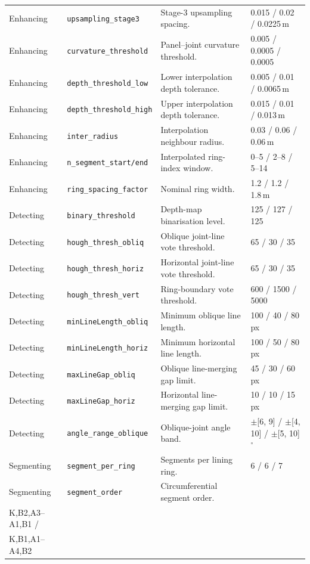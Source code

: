 \documentclass[a4paper,fleqn]{cas-dc}
\begin{document}
{\begin{table}[t]
\begin{tabular*}{\textwidth}{@{\extracolsep{\fill}} l l p{} l @{}}
Enhancing & \texttt{upsampling\_stage3} & Stage-3 upsampling spacing. & 0.015 / 0.02 / 0.0225\,m \\
Enhancing & \texttt{curvature\_threshold} & Panel--joint curvature threshold. & 0.005 / 0.0005 / 0.0005 \\
Enhancing & \texttt{depth\_threshold\_low} & Lower interpolation depth tolerance. & 0.005 / 0.01 / 0.0065\,m \\
Enhancing & \texttt{depth\_threshold\_high} & Upper interpolation depth tolerance. & 0.015 / 0.01 / 0.013\,m \\
Enhancing & \texttt{inter\_radius} & Interpolation neighbour radius. & 0.03 / 0.06 / 0.06\,m \\
Enhancing & \texttt{n\_segment\_start/end} & Interpolated ring-index window. & 0--5 / 2--8 / 5--14 \\
Enhancing & \texttt{ring\_spacing\_factor} & Nominal ring width. & 1.2 / 1.2 / 1.8\,m \\
\midrule
Detecting & \texttt{binary\_threshold} & Depth-map binarisation level. & 125 / 127 / 125 \\
Detecting & \texttt{hough\_thresh\_obliq} & Oblique joint-line vote threshold. & 65 / 30 / 35 \\
Detecting & \texttt{hough\_thresh\_horiz} & Horizontal joint-line vote threshold. & 65 / 30 / 35 \\
Detecting & \texttt{hough\_thresh\_vert} & Ring-boundary vote threshold. & 600 / 1500 / 5000 \\
Detecting & \texttt{minLineLength\_obliq} & Minimum oblique line length. & 100 / 40 /  80\,px \\
Detecting & \texttt{minLineLength\_horiz} & Minimum horizontal line length. & 100 / 50 /  80\,px \\
Detecting & \texttt{maxLineGap\_obliq} & Oblique line-merging gap limit. & 45 / 30 /  60\,px \\
Detecting & \texttt{maxLineGap\_horiz} & Horizontal line-merging gap limit. & 10 / 10 /  15\,px \\
Detecting & \texttt{angle\_range\_oblique} & Oblique-joint angle band. & $\pm$[6, 9] / $\pm$[4, 10] / $\pm$[5, 10]$^{\circ}$ \\
\midrule
Segmenting & \texttt{segment\_per\_ring} & Segments per lining ring. & 6 / 6 / 7 \\
Segmenting & \texttt{segment\_order} & Circumferential segment order. & \begin{tabular}[t]{@{}l@{}}K,B1,A1--A3,B2 /\\K,B2,A3--A1,B1 /\\K,B1,A1--A4,B2\end{tabular} \\

\end{tabular*}
\end{table}}
\end{document}
